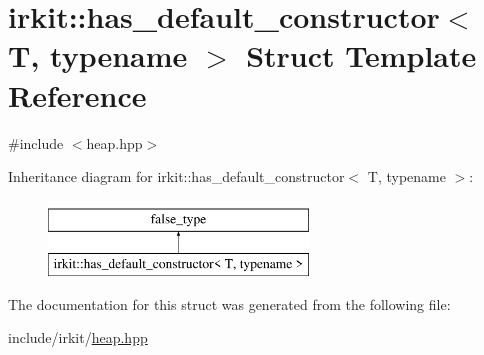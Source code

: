 \hypertarget{structirkit_1_1has__default__constructor}{}\section{irkit\+:\+:has\+\_\+default\+\_\+constructor$<$ T, typename $>$ Struct Template Reference}
\label{structirkit_1_1has__default__constructor}


{\ttfamily \#include $<$heap.\+hpp$>$}

Inheritance diagram for irkit\+:\+:has\+\_\+default\+\_\+constructor$<$ T, typename $>$\+:\begin{figure}[H]
\begin{center}
\leavevmode
\includegraphics[height=2.000000cm]{structirkit_1_1has__default__constructor}
\end{center}
\end{figure}


The documentation for this struct was generated from the following file\+:\begin{DoxyCompactItemize}
\item 
include/irkit/\mbox{\hyperlink{heap_8hpp}{heap.\+hpp}}\end{DoxyCompactItemize}
